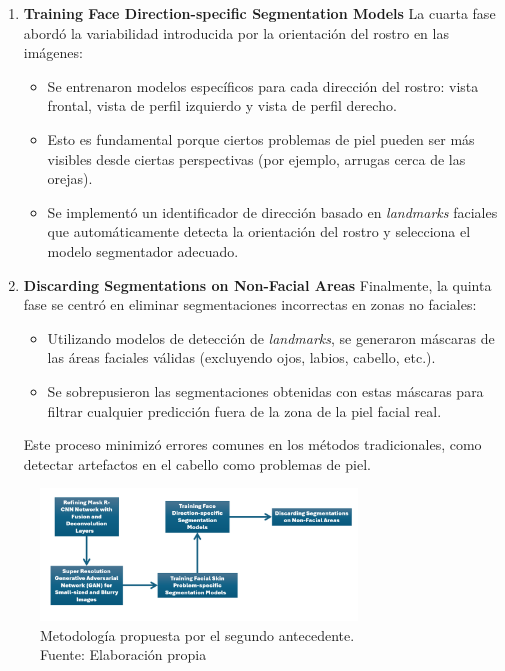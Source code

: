 \begin{enumerate}[label=\textbf{\arabic*.}, leftmargin=2em]
	\item \textbf{Training Face Direction-specific Segmentation Models}
	La cuarta fase abordó la variabilidad introducida por la orientación del rostro en las imágenes:
	
	\begin{itemize}
		\item Se entrenaron modelos específicos para cada dirección del rostro: vista frontal, vista de perfil izquierdo y vista de perfil derecho.
		\item Esto es fundamental porque ciertos problemas de piel pueden ser más visibles desde ciertas perspectivas (por ejemplo, arrugas cerca de las orejas).
		\item Se implementó un identificador de dirección basado en \textit{landmarks} faciales que automáticamente detecta la orientación del rostro y selecciona el modelo segmentador adecuado.
	\end{itemize}
	
	\item \textbf{Discarding Segmentations on Non-Facial Areas}
	Finalmente, la quinta fase se centró en eliminar segmentaciones incorrectas en zonas no faciales:
	
	\begin{itemize}
		\item Utilizando modelos de detección de \textit{landmarks}, se generaron máscaras de las áreas faciales válidas (excluyendo ojos, labios, cabello, etc.).
		\item Se sobrepusieron las segmentaciones obtenidas con estas máscaras para filtrar cualquier predicción fuera de la zona de la piel facial real.
	\end{itemize}
	Este proceso minimizó errores comunes en los métodos tradicionales, como detectar artefactos en el cabello como problemas de piel.
	
\end{enumerate}

\begin{figure}[H]
	\begin{center}
		\includegraphics[width=0.75\textwidth]{2/figures/metoant2.png}
		\caption[Metodología propuesta por el segundo antecedente]{Metodología propuesta por el segundo antecedente.\\
			Fuente: Elaboración propia}
		\label{2:figant2}
	\end{center}
\end{figure}

